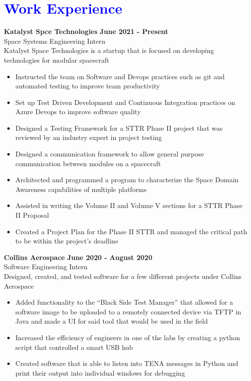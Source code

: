 \documentclass[10pt]{article}
\newcommand{\themeColorOne}{blue}
\newcommand{\sectionColor}{\themeColorOne}
\newcommand{\entrySpacing}{4pt}
\newcommand{\customSection}[1]{
  \section*{\textcolor{\sectionColor}{#1}}
  \vspace{0in}
}
\begin{document}
\customSection{Work Experience}
\noindent\begin{minipage}{\linewidth}
\textbf{Katalyst Spce Technologies} \hfill \textbf{June 2021 - Present}\\
Space Systems Engineering Intern\hfill \\Katalyst Space Technologies is a startup that is focused on developing technologies for modular spacecraft
\begin{itemize}[noitemsep,nolistsep]
\item Instructed the team on Software and Devops practices such as git and automated testing to improve team productivity
\item Set up Test Driven Development and Continuous Integration practices on Azure Devops to improve software quality
\item Designed a Testing Framework for a STTR Phase II project that was reviewed by an industry expert in project testing
\item Designed a communication framework to allow general purpose communication between modules on a spacecraft
\item Architected and programmed a program to characterize the Space Domain Awareness capabilities of multiple platforms
\item Assisted in writing the Volume II and Volume V sections for a STTR Phase II Proposal
\item Created a Project Plan for the Phase II STTR and managed the critical path to be within the project's deadline
\end{itemize}


\end{minipage}
\vspace{\entrySpacing}

\noindent\begin{minipage}{\linewidth}
\textbf{Collins Aerospace} \hfill \textbf{June 2020 - August 2020}\\
Software Engineering Intern\hfill \\Designed, created, and tested software for a few different projects under Collins Aerospace
\begin{itemize}[noitemsep,nolistsep]
\item Added functionality to the “Black Side Test Manager” that allowed for a software image to be uploaded to a remotely connected device via TFTP in Java and made a UI for said tool that would be used in the field
\item Increased the efficiency of engineers in one of the labs by creating a python script that controlled a smart USB hub
\item Created software that is able to listen into TENA messages in Python and print their output into individual windows for debugging
\end{itemize}


\end{minipage}
\vspace{\entrySpacing}
\end{document}
